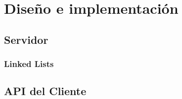 \section{Diseño e implementación}

\begin{figure}[!h]
    
\end{figure}

\subsection{Servidor}


\subsubsection{Linked Lists}


\subsection{API del Cliente}
